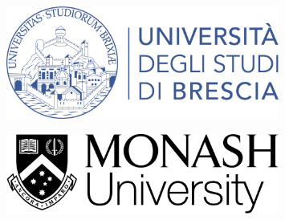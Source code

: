 \begin{frame}[plain]
    \titlepage
    \begin{minipage}{0.5\textwidth}
        \begin{figure}
            \centering
            \includegraphics[width=0.8\textwidth]{src/images/unibs}
        \end{figure}
    \end{minipage}\hfill%
    \begin{minipage}{0.5\textwidth}
        \begin{figure}
            \centering
            \includegraphics[width=0.8\textwidth]{src/images/monash}
        \end{figure}
    \end{minipage}%
\end{frame}